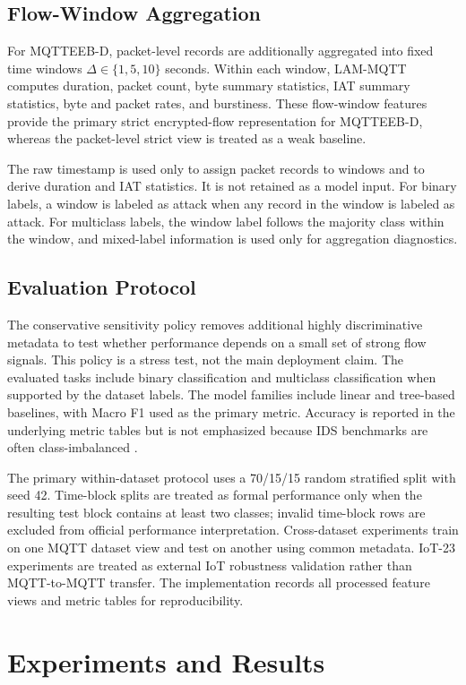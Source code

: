 \documentclass[lettersize,journal]{IEEEtran}
\begin{document}
\subsection{Flow-Window Aggregation}
For MQTTEEB-D, packet-level records are additionally aggregated into fixed time windows $\Delta \in \{1,5,10\}$ seconds. Within each window, LAM-MQTT computes duration, packet count, byte summary statistics, IAT summary statistics, byte and packet rates, and burstiness. These flow-window features provide the primary strict encrypted-flow representation for MQTTEEB-D, whereas the packet-level strict view is treated as a weak baseline.

The raw timestamp is used only to assign packet records to windows and to derive duration and IAT statistics. It is not retained as a model input. For binary labels, a window is labeled as attack when any record in the window is labeled as attack. For multiclass labels, the window label follows the majority class within the window, and mixed-label information is used only for aggregation diagnostics.

\subsection{Evaluation Protocol}
The conservative sensitivity policy removes additional highly discriminative metadata to test whether performance depends on a small set of strong flow signals. This policy is a stress test, not the main deployment claim. The evaluated tasks include binary classification and multiclass classification when supported by the dataset labels. The model families include linear and tree-based baselines, with Macro F1 used as the primary metric. Accuracy is reported in the underlying metric tables but is not emphasized because IDS benchmarks are often class-imbalanced \cite{buczak2016survey,khraisat2019survey}.

The primary within-dataset protocol uses a 70/15/15 random stratified split with seed 42. Time-block splits are treated as formal performance only when the resulting test block contains at least two classes; invalid time-block rows are excluded from official performance interpretation. Cross-dataset experiments train on one MQTT dataset view and test on another using common metadata. IoT-23 experiments are treated as external IoT robustness validation rather than MQTT-to-MQTT transfer. The implementation records all processed feature views and metric tables for reproducibility.

\section{Experiments and Results}
\label{sec:results}
\end{document}
